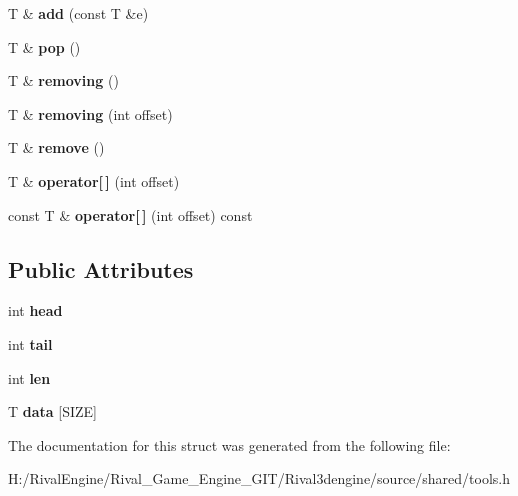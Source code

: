 \begin{DoxyCompactItemize}
T \& {\bfseries add} (const T \&e)
\item 
\mbox{\label{structqueue_a0a5e84ae0781d9ca3894d4390dc206fa}} 
T \& {\bfseries pop} ()
\item 
\mbox{\label{structqueue_ad48e56680efac5e80c158c656908cd98}} 
T \& {\bfseries removing} ()
\item 
\mbox{\label{structqueue_a2d2efb1e88635a9bdf3da8d2e9e0dfc0}} 
T \& {\bfseries removing} (int offset)
\item 
\mbox{\label{structqueue_a82cce644180b61ffb5a36934ff10d837}} 
T \& {\bfseries remove} ()
\item 
\mbox{\label{structqueue_ae755a14dc19d6c1157b3be0375ce024b}} 
T \& {\bfseries operator\mbox{[}$\,$\mbox{]}} (int offset)
\item 
\mbox{\label{structqueue_ab516540644343a2c399c5ca0058e4199}} 
const T \& {\bfseries operator\mbox{[}$\,$\mbox{]}} (int offset) const
\end{DoxyCompactItemize}
\subsection*{Public Attributes}
\begin{DoxyCompactItemize}
\item 
\mbox{\label{structqueue_a499aa654623fbdf0a1b7e0902295379e}} 
int {\bfseries head}
\item 
\mbox{\label{structqueue_a75e862a553edc9dff30c46e5f852806e}} 
int {\bfseries tail}
\item 
\mbox{\label{structqueue_a81c87f4f4825a08b4596cf7038dfab67}} 
int {\bfseries len}
\item 
\mbox{\label{structqueue_a7ea342bb0fbae9484005f77075eebd93}} 
T {\bfseries data} \mbox{[}S\+I\+ZE\mbox{]}
\end{DoxyCompactItemize}


The documentation for this struct was generated from the following file\+:\begin{DoxyCompactItemize}
\item 
H\+:/\+Rival\+Engine/\+Rival\+\_\+\+Game\+\_\+\+Engine\+\_\+\+G\+I\+T/\+Rival3dengine/source/shared/tools.\+h\end{DoxyCompactItemize}
